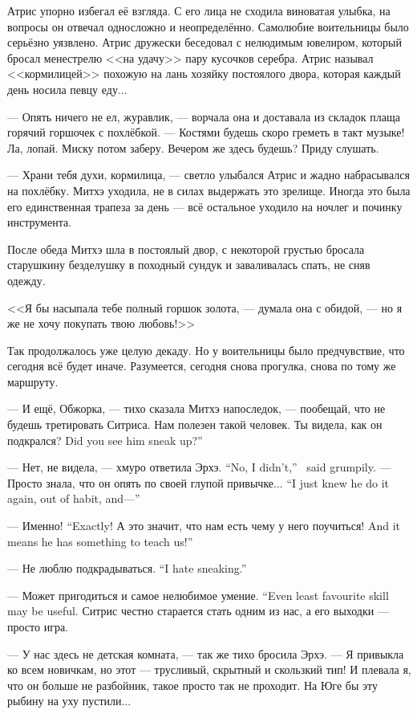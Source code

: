 Атрис упорно избегал её взгляда.
С его лица не сходила виноватая улыбка, на вопросы он отвечал односложно и неопределённо.
Самолюбие воительницы было серьёзно уязвлено.
Атрис дружески беседовал с нелюдимым ювелиром, который бросал менестрелю <<на удачу>> пару кусочков серебра.
Атрис называл <<кормилицей>> похожую на лань хозяйку постоялого двора, которая каждый день носила певцу еду...

--- Опять ничего не ел, журавлик, --- ворчала она и доставала из складок плаща горячий горшочек с похлёбкой.
--- Костями будешь скоро греметь в такт музыке!
Ла, лопай.
Миску потом заберу.
Вечером же здесь будешь?
Приду слушать.

--- Храни тебя духи, кормилица, --- светло улыбался Атрис и жадно набрасывался на похлёбку.
Митхэ уходила, не в силах выдержать это зрелище.
Иногда это была его единственная трапеза за день --- всё остальное уходило на ночлег и починку инструмента.

После обеда Митхэ шла в постоялый двор, с некоторой грустью бросала старушкину безделушку в походный сундук и заваливалась спать, не сняв одежду.

<<Я бы насыпала тебе полный горшок золота, --- думала она с обидой, --- но я же не хочу покупать твою любовь!>>

Так продолжалось уже целую декаду.
Но у воительницы было предчувствие, что сегодня всё будет иначе.
Разумеется, сегодня снова прогулка, снова по тому же маршруту.

--- И ещё, Обжорка, --- тихо сказала Митхэ напоследок, --- пообещай, что не будешь третировать Ситриса.
Нам полезен такой человек.
{Ты видела, как он подкрался?}
{Did you see him sneak up?''}

{--- Нет, не видела, --- хмуро ответила Эрхэ.}
{``No, I didn't,'' \Oerchoe\ said grumpily.}
{--- Просто знала, что он опять по своей глупой привычке...}
{``I just knew he do it again, out of habit, and---''}

{--- Именно!}
{``Exactly!}
{А это значит, что нам есть чему у него поучиться!}
{And it means he has something to teach us!''}

{--- Не люблю подкрадываться.}
{``I hate sneaking.''}

{--- Может пригодиться и самое нелюбимое умение.}
{``Even least favourite skill may be useful.}
Ситрис честно старается стать одним из нас, а его выходки --- просто игра.

--- У нас здесь не детская комната, --- так же тихо бросила Эрхэ.
--- Я привыкла ко всем новичкам, но этот --- трусливый, скрытный и скользкий тип!
И плевала я, что он больше не разбойник, такое просто так не проходит.
На Юге бы эту рыбину на уху пустили...

